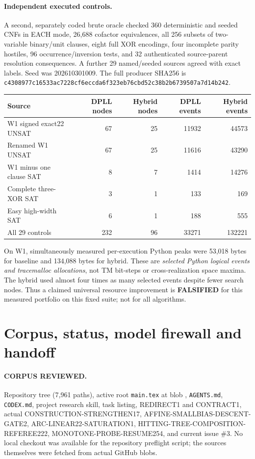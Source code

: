 \documentclass[11pt]{article}
\begin{document}
\paragraph{Independent executed controls.}
A second, separately coded brute oracle checked 360 deterministic and
seeded CNFs in EACH mode, 26,688 cofactor equivalences, all 256
subsets of two-variable binary/unit clauses, eight full XOR encodings,
four incomplete parity hostiles, 96 occurrence/inversion tests, and
32 authenticated source-parent resolution consequences.
A further 29 named/seeded sources agreed with exact labels.
Seed was 202610301009. The full producer SHA256 is
\texttt{c4308977c16533ac7228cf6eccda6f323eb76cbd52c38b2b6739507a7d14b242}.
\begin{center}\small
\begin{tabular}{lrrrr}
\toprule
Source & DPLL nodes & Hybrid nodes & DPLL events & Hybrid events\\
\midrule
W1 signed exact22 UNSAT &67&25&11932&44573\\
Renamed W1 UNSAT &67&25&11616&43290\\
W1 minus one clause SAT&8&7&1414&14276\\
Complete three-XOR SAT&3&1&133&169\\
Easy high-width SAT&6&1&188&555\\
All 29 controls&232&96&33271&132221\\
\bottomrule
\end{tabular}
\end{center}
On W1, simultaneously measured per-execution Python peaks were
53,018 bytes for baseline and 134,088 bytes for hybrid. These are
\emph{selected Python logical events and tracemalloc allocations}, not
TM bit-steps or cross-realization space maxima. The hybrid used almost
four times as many selected events despite fewer search nodes.
Thus a claimed universal resource improvement is \textbf{FALSIFIED}
for this measured portfolio on this fixed suite; not for all algorithms.

\section{Corpus, status, model firewall and handoff}
\paragraph{CORPUS REVIEWED.} Repository tree (7,961 paths), active
root \texttt{main.tex} at blob
,
\texttt{AGENTS.md}, \texttt{CODEX.md}, project research skill, task
listing, REDIRECT1 and CONTRACT1, actual
CONSTRUCTION-STRENGTHEN17, AFFINE-SMALLBIAS-DESCENT-GATE2,
ARC-LINEAR22-SATURATION1, HITTING-TREE-COMPOSITION-REFEREE222,
MONOTONE-PROBE-RESUME254, and current issue \#3.
No local checkout was available for the repository preflight script;
the sources themselves were fetched from actual GitHub blobs.
\end{document}
